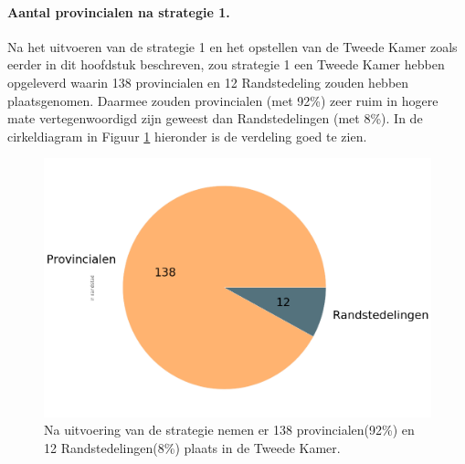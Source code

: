 \paragraph{Aantal provincialen na strategie 1.}
Na het uitvoeren van de strategie 1 en het opstellen van de Tweede Kamer zoals eerder in dit hoofdstuk beschreven, zou strategie 1 een Tweede Kamer hebben opgeleverd waarin 138 provincialen en 12 Randstedeling zouden hebben plaatsgenomen. Daarmee zouden provincialen (met 92\%) zeer ruim in hogere mate vertegenwoordigd zijn geweest dan Randstedelingen (met 8\%). In de cirkeldiagram in Figuur \ref{fig:pcS1P} hieronder is de verdeling goed te zien. 

\begin{figure}[H]
\centering
	\includegraphics[width=0.45\linewidth]{pie_chart_topN_provincialen.png}

			\caption{Na uitvoering van de strategie nemen er 138 provincialen(92\%) en 12 Randstedelingen(8\%) plaats in de Tweede Kamer.} 

\label{fig:pcS1P}
\end{figure}

